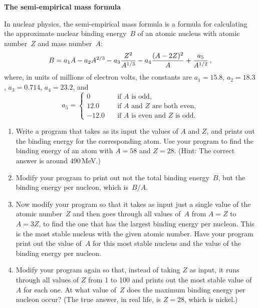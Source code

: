 \documentclass[12pt]{article}
\begin{document}
\begin{exercises}

\exercise \textbf{The semi-empirical mass formula}

\exskip In nuclear physics, the semi-empirical mass formula is a formula
for calculating the approximate nuclear binding energy~$B$ of an atomic
nucleus with atomic number~$Z$ and mass number~$A$:
\begin{displaymath}
B = a_1 A - a_2 A^{2/3} - a_3 {Z^2\over A^{1/3}}
    - a_4 {(A - 2Z)^2\over A} + {a_5\over A^{1/2}}\,,
\end{displaymath}
where, in units of millions of electron volts, the constants are
$a_1=15.8$, $a_2=18.3$, $a_3=0.714$, $a_4=23.2$, and
\begin{displaymath}
a_5 = \left\lbrace\begin{array}{ll}
      0     &\quad\mbox{if $A$ is odd,} \\
      12.0  &\quad\mbox{if $A$ and $Z$ are both even,} \\
      -12.0 &\quad\mbox{if $A$ is even and $Z$ is odd.}
      \end{array}\right.
\end{displaymath}
\begin{enumerate}\setlength{\itemsep}{0pt}
\item Write a program that takes as its input the values of $A$ and $Z$,
  and prints out the binding energy for the corresponding atom.  Use your
  program to find the binding energy of an atom with $A=58$ and $Z=28$.
  (Hint: The correct answer is around $490\,$MeV.)
\item Modify your program to print out not the total binding energy~$B$,
  but the binding energy per nucleon, which is~$B/A$.
\item Now modify your program so that it takes as input just a single value
  of the atomic number~$Z$ and then goes through all values of~$A$ from
  $A=Z$ to $A=3Z$, to find the one that has the largest binding energy per
  nucleon.  This is the most stable nucleus with the given atomic number.
  Have your program print out the value of~$A$ for this most stable nucleus
  and the value of the binding energy per nucleon.
\item Modify your program again so that, instead of taking $Z$ as input, it
  runs through all values of $Z$ from 1 to 100 and prints out the most
  stable value of $A$ for each one.  At what value of~$Z$ does the maximum
  binding energy per nucleon occur?  (The true answer, in real life, is
  $Z=28$, which is nickel.)
\end{enumerate}



\end{exercises}
\end{document}
